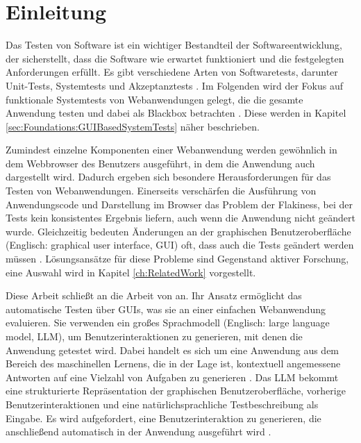 
\chapter{Einleitung}
\label{ch:Introduction}




Das Testen von Software ist ein wichtiger Bestandteil der Softwareentwicklung, der sicherstellt, dass die Software wie erwartet funktioniert und die festgelegten Anforderungen erfüllt.
Es gibt verschiedene Arten von Softwaretests, darunter Unit-Tests, Systemtests und Akzeptanztests \cite{Sommerville10}.
Im Folgenden wird der Fokus auf funktionale Systemtests von Webanwendungen gelegt, die die gesamte Anwendung testen und dabei als Blackbox betrachten \cite{Beizer1990}.
Diese werden in Kapitel \ref{sec:Foundations:GUIBasedSystemTests} näher beschrieben.


Zumindest einzelne Komponenten einer Webanwendung werden gewöhnlich in dem Webbrowser des Benutzers ausgeführt, in dem die Anwendung auch dargestellt wird.
Dadurch ergeben sich besondere Herausforderungen für das Testen von Webanwendungen.
Einerseits verschärfen die Ausführung von Anwendungscode und Darstellung im Browser das Problem der Flakiness, bei der Tests kein konsistentes Ergebnis liefern, auch wenn die Anwendung nicht geändert wurde.
Gleichzeitig bedeuten Änderungen an der graphischen Benutzeroberfläche (Englisch: graphical user interface, GUI) oft, dass auch die Tests geändert werden müssen \cite{ChallengesSelenium}.
Lösungsansätze für diese Probleme sind Gegenstand aktiver Forschung, eine Auswahl wird in Kapitel \ref{ch:RelatedWork} vorgestellt.


Diese Arbeit schließt an die Arbeit von  an.
Ihr Ansatz ermöglicht das automatische Testen über GUIs, was sie an einer einfachen Webanwendung evaluieren.
Sie verwenden ein großes Sprachmodell (Englisch: large language model, LLM), um Benutzerinteraktionen zu generieren, mit denen die Anwendung getestet wird.
Dabei handelt es sich um eine Anwendung aus dem Bereich des maschinellen Lernens, die in der Lage ist, kontextuell angemessene Antworten auf eine Vielzahl von Aufgaben zu generieren \cite{FewShotLearners}.
Das LLM bekommt eine strukturierte Repräsentation der graphischen Benutzeroberfläche, vorherige Benutzerinteraktionen und eine natürlichsprachliche Testbeschreibung als Eingabe.
Es wird aufgefordert, eine Benutzerinteraktion zu generieren, die anschließend automatisch in der Anwendung ausgeführt wird \cite{GPT3Testing}.

